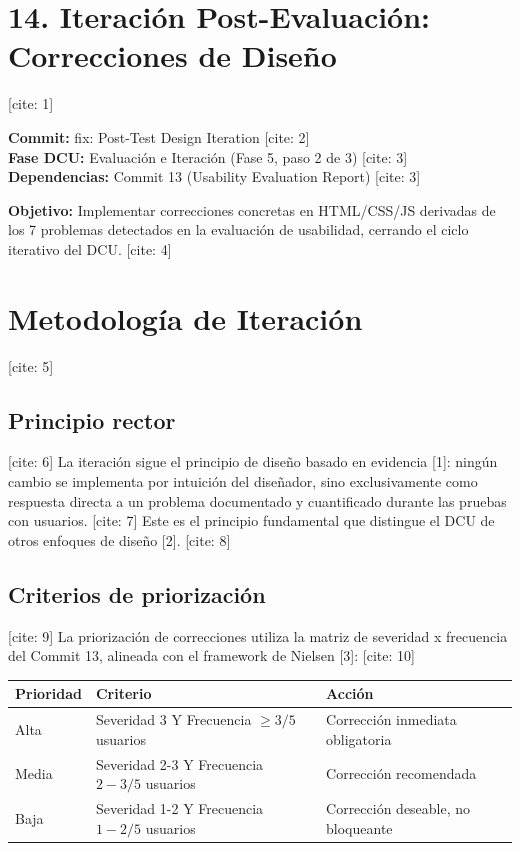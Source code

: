 \documentclass{article}
\begin{document}
\section*{14. Iteración Post-Evaluación: Correcciones de Diseño} [cite: 1]

\textbf{Commit:} fix: Post-Test Design Iteration [cite: 2] \\
\textbf{Fase DCU:} Evaluación e Iteración (Fase 5, paso 2 de 3) [cite: 3] \\
\textbf{Dependencias:} Commit 13 (Usability Evaluation Report) [cite: 3]

\textbf{Objetivo:} Implementar correcciones concretas en HTML/CSS/JS derivadas de los 7 problemas detectados en la evaluación de usabilidad, cerrando el ciclo iterativo del DCU. [cite: 4]

\section{Metodología de Iteración} [cite: 5]

\subsection{Principio rector} [cite: 6]
La iteración sigue el principio de diseño basado en evidencia [1]: ningún cambio se implementa por intuición del diseñador, sino exclusivamente como respuesta directa a un problema documentado y cuantificado durante las pruebas con usuarios. [cite: 7] Este es el principio fundamental que distingue el DCU de otros enfoques de diseño [2]. [cite: 8]

\subsection{Criterios de priorización} [cite: 9]
La priorización de correcciones utiliza la matriz de severidad x frecuencia del Commit 13, alineada con el framework de Nielsen [3]: [cite: 10]

\begin{table}[h]
\centering
\begin{tabular}{lll}
\toprule
\textbf{Prioridad} & \textbf{Criterio} & \textbf{Acción} \\ [cite: 11]
\midrule
Alta & Severidad 3 Y Frecuencia $\ge3/5$ usuarios & Corrección inmediata obligatoria \\ [cite: 11]
Media & Severidad 2-3 Y Frecuencia $2-3/5$ usuarios & Corrección recomendada \\ [cite: 11]
Baja & Severidad 1-2 Y Frecuencia $1-2/5$ usuarios & Corrección deseable, no bloqueante \\ [cite: 11]
\bottomrule
\end{tabular}
\end{table}
\end{document}
